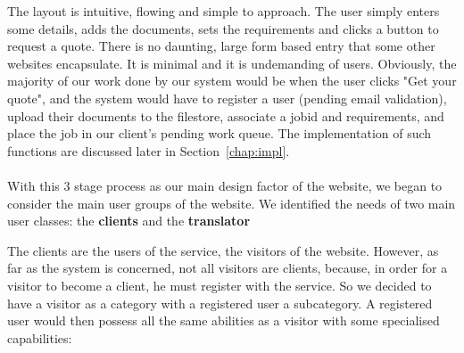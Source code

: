 \documentclass{l3proj}
\begin{document}
The layout is intuitive, flowing and simple to approach. The user simply enters some details, adds the documents, sets the requirements and clicks a button to request a quote. There is no daunting, large form based entry that some other websites encapsulate. It is minimal and it is undemanding of users. Obviously, the majority of our work done by our system would be when the user clicks "Get your quote", and the system would have to register a user (pending email validation), upload their documents to the filestore, associate a jobid and requirements, and place the job in our client's pending work queue. The implementation of such functions are discussed later in Section~\ref{chap:impl}.\\
\\
With this 3 stage process as our main design factor of the website, we began to consider the main user groups of the website. We identified the needs of two main user classes: the \textbf{clients} and the \textbf{translator}

The clients are the users of the service, the visitors of the website. However, as far as the system is concerned, not all visitors are clients, because, in order for a visitor to become a client, he must register with the service. So we decided to have a visitor as a category with a registered user a subcategory. A registered user would then possess all the same abilities as a visitor with some specialised capabilities:
\end{document}
